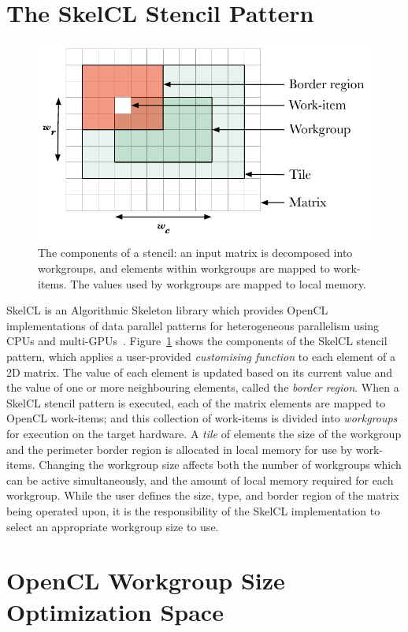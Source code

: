 \documentclass[hidelinks]{acaces}
\begin{document}
\section{The SkelCL Stencil Pattern}

\begin{figure}
\includegraphics[width=.38\textwidth]{stencil}
\caption[Stencil border region]{%
  The components of a stencil: an input matrix is decomposed into
  workgroups, and elements within workgroups are mapped to work-items.
  The values used by workgroups are mapped to local memory.%
  \vspace{-.75em} }
\label{fig:stencil-shape}
\end{figure}

SkelCL is an Algorithmic Skeleton library which provides OpenCL
implementations of data parallel patterns for heterogeneous
parallelism using CPUs and
multi-GPUs~\cite{Steuwer2011}. Figure~\ref{fig:stencil-shape} shows
the components of the SkelCL stencil pattern, which applies a
user-provided \emph{customising function} to each element of a 2D
matrix. The value of each element is updated based on its current
value and the value of one or more neighbouring elements, called the
\emph{border region}. When a SkelCL stencil pattern is executed, each
of the matrix elements are mapped to OpenCL work-items; and this
collection of work-items is divided into \emph{workgroups} for
execution on the target hardware. A \emph{tile} of elements the size
of the workgroup and the perimeter border region is allocated in local
memory for use by work-items. Changing the workgroup size affects both
the number of workgroups which can be active simultaneously, and the
amount of local memory required for each workgroup. While the user
defines the size, type, and border region of the matrix being operated
upon, it is the responsibility of the SkelCL implementation to select
an appropriate workgroup size to use.

\section{OpenCL Workgroup Size Optimization Space}
\end{document}
